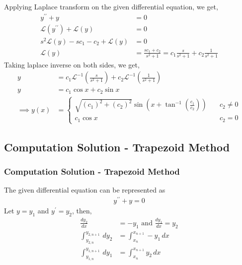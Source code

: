 \documentclass{beamer}
\providecommand{\brak}[1]{\ensuremath{\left(#1\right)}}
\theoremstyle{remark}
\numberwithin{equation}{section}
\begin{document}
\begin{frame}
Applying Laplace transform on the given differential equation, we get,
\begin{align}
    y^{\prime\prime} + y &= 0\\
    \mathcal{L}\brak{y^{\prime\prime}} + \mathcal{L}\brak{y} &= 0\\
    s^2\mathcal{L}\brak{y} - sc_1 - c_2 + \mathcal{L}\brak{y} &= 0\\
    \mathcal{L}\brak{y} &= \frac{sc_1 + c_2}{s^2 + 1} = c_1\frac{s}{s^2 + 1} + c_2\frac{1}{s^2 + 1} \label{laplace_eq}
\end{align}
Taking laplace inverse on both sides, we get,
\begin{align}
    y &= c_1\mathcal{L}^{-1}\brak{\frac{s}{s^2 + 1}} + c_2\mathcal{L}^{-1}\brak{\frac{1}{s^2 + 1}}\\
    y &= c_1\cos{x} + c_2\sin{x}\\
    \implies y\brak{x} &= 
    \begin{cases}
        \sqrt{\brak{c_1}^2 + \brak{c_2}^2} \sin{\brak{x + \tan^{-1}{\brak{\frac{c_1}{c_2}}}}} & \quad c_2 \neq 0\\
        c_1\cos{x} & \quad c_2 = 0
    \end{cases}
\end{align}
\end{frame}

\subsection{Computation Solution - Trapezoid Method}
\begin{frame}
\frametitle{Computation Solution - Trapezoid Method}
The given differential equation can be represented as 
\begin{align}
    y^{\prime\prime} + y = 0
\end{align}
Let $y = y_1$ and $y^{\prime} = y_2$, then, 
\begin{align}
    \frac{dy_2}{dx} &= -y_1 \text{ and } \frac{dy_1}{dx} = y_2\\
    \int_{y_{2, n}}^{y_{2, n + 1}} \, dy_2 &= \int_{x_n}^{x_{n + 1}} -y_1 \, dx\\
    \int_{y_{1, n}}^{y_{1, n + 1}} \, dy_1 &= \int_{x_n}^{x_{n + 1}} y_2 \, dx\\
\end{align}
\end{frame}
\end{document}
